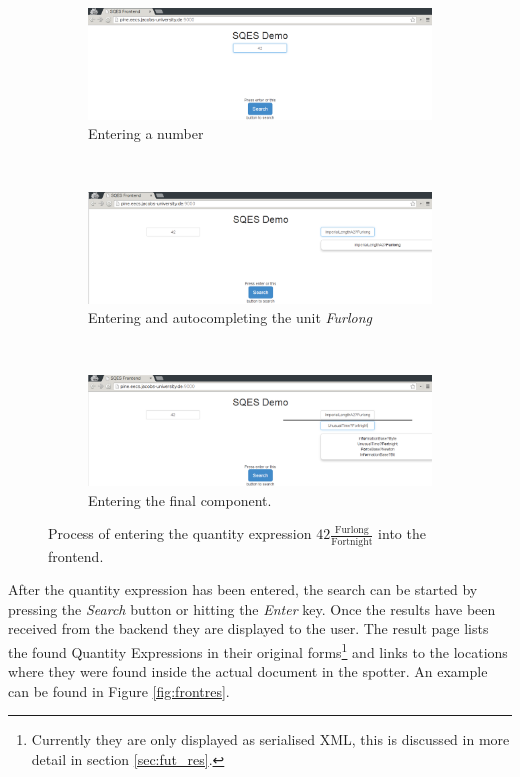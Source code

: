 \begin{figure}
  \centering
  \begin{subfigure}[b]{0.9\textwidth}
          \includegraphics[width=\textwidth]{img/enter1}
          \caption{Entering a number}
          \label{fig:frontauto1}
  \end{subfigure}
  \\
  \begin{subfigure}[b]{0.9\textwidth}
          \includegraphics[width=\textwidth]{img/enter2}
          \caption{Entering and autocompleting the unit \textit{Furlong}}
          \label{fig:frontauto2}
  \end{subfigure}
  \\
  \begin{subfigure}[b]{0.9\textwidth}
          \includegraphics[width=\textwidth]{img/enter3}
          \caption{Entering the final component. }
          \label{fig:frontauto3}
  \end{subfigure}
  \caption{Process of entering the quantity expression $42 \frac{\text{Furlong}}{\text{Fortnight}}$ into the frontend. }
  \label{fig:frontauto}
\end{figure}

After the quantity expression has been entered, the search can be started by pressing the \textit{Search} button or hitting the \textit{Enter} key. Once the results have been received from the backend they are displayed to the user. The result page lists the found Quantity Expressions in their original forms\footnote{Currently they are only displayed as serialised XML, this is discussed in more detail in section \ref{sec:fut_res}. } and links to the locations where they were found inside the actual document in the spotter. An example can be found in Figure \ref{fig:frontres}.

